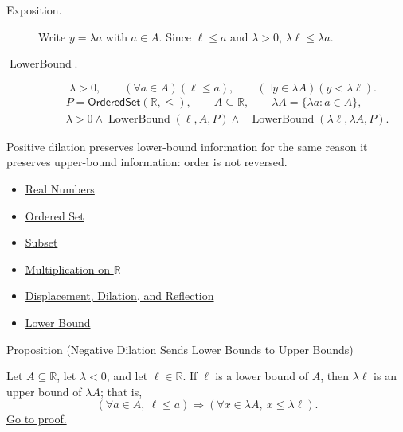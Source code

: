 \begin{remark*}
\begin{description}
\item[Exposition.]
Write $y=\lambda a$ with $a\in A$.  Since $\ell\leq a$ and $\lambda>0$,
$\lambda\ell\leq\lambda a$.


  \item[\(\operatorname{LowerBound}.\)]
  \[
\lambda>0,\qquad(\forall a\in A)(\ell\leq a),\qquad
(\exists y\in\lambda A)(y<\lambda\ell).
\]
\[
\begin{aligned}
&P=\mathsf{OrderedSet}(\mathbb{R},\leq),\qquad
A\subseteq\mathbb{R},\qquad \lambda A=\{\lambda a:a\in A\},\\
&\lambda>0\land\operatorname{LowerBound}(\ell,A,P)\land
\neg\operatorname{LowerBound}(\lambda\ell,\lambda A,P).
\end{aligned}
\]
\end{description}
\end{remark*}

\begin{remark*}[Interpretation]
Positive dilation preserves lower-bound information for the same reason it
preserves upper-bound information: order is not reversed.
\end{remark*}

\begin{dependencies}
\begin{itemize}
  \item \hyperref[def:reals]{Real Numbers}
  \item \hyperref[def:ordered-set]{Ordered Set}
  \item \hyperref[def:subset]{Subset}
  \item \hyperref[def:multiplication-on-r]{Multiplication on $\mathbb{R}$}
  \item \hyperref[def:displacement-dilation-reflection]{Displacement, Dilation, and Reflection}
  \item \hyperref[def:real-lower-bound]{Lower Bound}
\end{itemize}
\end{dependencies}

\begin{propositionbox}{Proposition (Negative Dilation Sends Lower Bounds to Upper Bounds)}
\begin{proposition}
\label{prop:negative-dilation-sends-lower-to-upper-bounds}
Let $A\subseteq\mathbb{R}$, let $\lambda<0$, and let
$\ell\in\mathbb{R}$.  If $\ell$ is a lower bound of $A$, then
$\lambda\ell$ is an upper bound of $\lambda A$; that is,
\[
\left(\forall a\in A,\ \ell\leq a\right)
\Longrightarrow
\left(\forall x\in\lambda A,\ x\leq \lambda\ell\right).
\]
\hyperref[prf:negative-dilation-sends-lower-to-upper-bounds]{Go to proof.}
\end{proposition}
\end{propositionbox}

